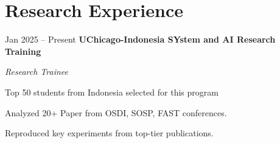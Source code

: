 \section{Research Experience}

\begin{twocolentry}{
    Jan 2025 – Present
}
\textbf{UChicago-Indonesia SYstem and AI Research Training}\end{twocolentry}
\textit{Research Trainee}

\vspace{0.10 cm}
\begin{onecolentry}
    \begin{highlights}
        \item Top 50 students from Indonesia selected for this program
        \item Analyzed 20+ Paper from OSDI, SOSP, FAST conferences.
        \item Reproduced key experiments from top-tier publications.
    \end{highlights}
\end{onecolentry}

\vspace{0.2 cm}
